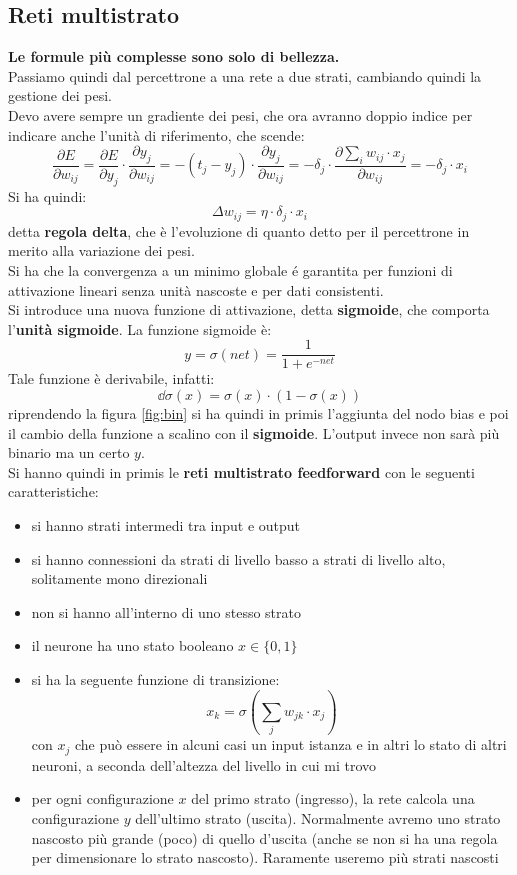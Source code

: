 					\subsection{Reti multistrato}
					\textbf{Le formule più complesse sono solo di bellezza.}\\
					\noindent
					Passiamo quindi dal percettrone a una rete a due strati, cambiando quindi la
					gestione dei pesi.\\
					Devo avere sempre un gradiente dei pesi, che ora avranno doppio indice per
					indicare anche l'unità di riferimento, che scende:
					\[\frac{\partial E}{\partial w_{ij}}=\frac{\partial E}{\partial y_{j}}\cdot
						\frac{\partial y_j}{\partial w_{ij}}=-(t_j-y_j)\cdot \frac{\partial
							y_j}{\partial w_{ij}}=-\delta_j\cdot\frac{\partial \sum_i w_{ij}\cdot
							x_j}{\partial w_{ij}}=-\delta_j\cdot x_i\]
						Si ha quindi:
						\[\Delta w_{ij}=\eta\cdot \delta_j\cdot x_i\]
						detta \textbf{regola delta}, che è l'evoluzione di quanto detto per il
						percettrone in merito alla variazione dei pesi.\\
						Si ha che la convergenza a un minimo globale é garantita per funzioni di
						attivazione lineari senza unità nascoste e per dati consistenti.\\
						Si introduce una nuova funzione di attivazione, detta \textbf{sigmoide}, che
						comporta l'\textbf{unità sigmoide}. La funzione sigmoide è:
						\[y=\sigma(net)=\frac{1}{1+e^{-net}}\]
						Tale funzione è derivabile, infatti:
						\[\dd \sigma(x)=\sigma(x)\cdot (1-\sigma(x))\]
						riprendendo la figura \ref{fig:bin} si ha quindi in primis l'aggiunta del nodo
						bias e poi il cambio della funzione a scalino con il \textbf{sigmoide}. L'output
						invece non sarà più binario ma un certo $y$.\\
						Si hanno quindi in primis le \textbf{reti multistrato feedforward} con le
						seguenti caratteristiche:
						\begin{itemize}
							\item si hanno strati intermedi tra input e output
							\item si hanno connessioni da strati di livello basso a strati di livello
							      alto, solitamente mono direzionali
							\item non si hanno all'interno di uno stesso strato
							\item il neurone ha uno stato booleano $x\in\{0, 1\}$
							\item si ha la seguente funzione di transizione:
							      \[x_k=\sigma\left(\sum_{j}w_{jk}\cdot x_j\right)\]
							      con $x_j$ che può essere in alcuni
							      casi un input istanza e in altri lo stato di altri neuroni, a seconda
							      dell'altezza del livello in cui mi trovo
							\item per ogni configurazione $x$ del primo strato (ingresso), la rete calcola
							      una configurazione $y$ dell'ultimo strato (uscita). Normalmente avremo uno
							      strato nascosto più grande (poco) di quello d'uscita (anche se non si ha una
							      regola per dimensionare lo strato nascosto). Raramente useremo più strati
							      nascosti
						\end{itemize}
